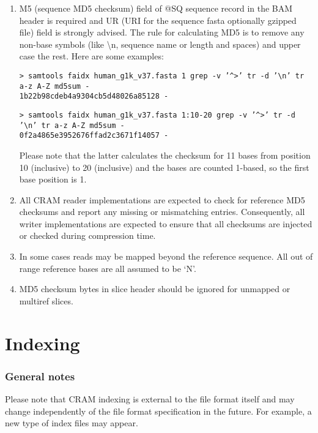 \documentclass[a4paper]{article}
\begin{document}
\begin{enumerate}
\item M5 (sequence MD5 checksum) field of @SQ sequence record in the BAM header is 
required and UR (URI for the sequence fasta optionally gzipped file) field is strongly 
advised. The rule for calculating MD5 is to remove any non-base symbols (like \textbackslash{}n, 
sequence name or length and spaces) and upper case the rest. Here are some examples: 

\texttt{> samtools faidx human\_g1k\_v37.fasta 1 \textbar{} grep -v '\textasciicircum{}>' \textbar{} tr -d '\textbackslash{}n' \textbar{} tr a-z A-Z \textbar{} md5sum -\\
1b22b98cdeb4a9304cb5d48026a85128  -}

\texttt{> samtools faidx human\_g1k\_v37.fasta 1:10-20 \textbar{}grep -v '\textasciicircum{}\texttt{>}' \textbar{}tr -d '\textbackslash{}n' \textbar{}tr a-z A-Z \textbar{}md5sum -\\
0f2a4865e3952676ffad2c3671f14057  -}

Please note that the latter calculates the checksum for 11 bases from position 
10 (inclusive) to 20 (inclusive) and the bases are counted 1-based, so the first 
base position is 1. 

\item All CRAM reader implementations are expected to check for reference MD5 checksums 
and report any missing or mismatching entries. Consequently, all writer implementations 
are expected to ensure that all checksums are injected or checked during compression 
time. 

\item In some cases reads may be mapped beyond the reference sequence. All out of 
range reference bases are all assumed to be `N'. 

\item MD5 checksum bytes in slice header should be ignored for unmapped or multiref 
slices. 
\end{enumerate}

\section{\textbf{Indexing}}

\subsubsection*{General notes}

Please note that CRAM indexing is external to the file format itself and may change 
independently of the file format specification in the future. For example, a new 
type of index files may appear. 
\end{document}
